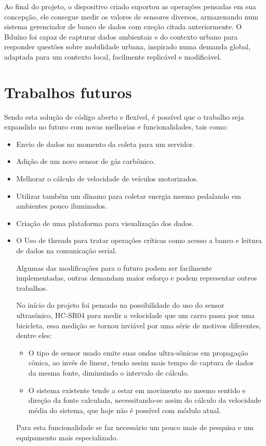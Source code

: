 \documentclass[final,12pt, times, 5p, twocolumn]{elsarticle}
\begin{document}
Ao final do projeto, o dispositivo criado suportou as operações pensadas em sua concepção, ele consegue medir os valores de sensores diversos, armazenando num sistema gerenciador de banco de dados com exeção citada anteriormente. O Bduíno foi capaz de capturar dados ambientais e do contexto urbano para responder questões sobre mobilidade urbana, inspirado numa demanda global, adaptada para um contexto local, facilmente replicável e modificável.

\section{Trabalhos futuros}

Sendo esta solução de código aberto e flexível, é possível que o trabalho seja expandido no futuro com novas melhorias e funcionalidades, tais como:

\begin{itemize}

  \item Envio de dados no momento da coleta para um servidor.
  \item Adição de um novo sensor de gás carbônico.
  \item Melhorar o cálculo de velocidade de veículos motorizados.
  \item Utilizar também um dînamo para coletar energia mesmo pedalando em ambientes pouco iluminados.
  \item Criação de uma plataforma para visualização dos dados.
  \item O Uso de threads para tratar operações críticas como acesso a banco e leitura de dados na comunicação serial.
  
Algumas das modificações para o futuro podem ser facilmente implementadas, outras demandam maior esforço e podem representar outros trabalhos.

No início do projeto foi pensado na possibilidade do uso do sensor ultrasônico, HC-SR04 para medir a velocidade que um carro passa por uma bicicleta, essa medição se tornou inviável por uma série de motivos diferentes, dentre eles: 

\begin{itemize}
\item O tipo de sensor usado emite suas ondas ultra-sônicas em propagação cônica, ao invés de linear, tendo assim mais tempo de captura de dados da mesma fonte, diminuindo o intervalo de cálculo.

\item O sistema existente tende a estar em movimento no mesmo sentido e direção da fonte calculada, necessitando-se assim do cálculo da velocidade média do sistema, que hoje não é possível com módulo atual.
\end{itemize}

Para esta funcionalidade se faz necessário um pouco mais de pesquisa e um equipamento mais especializado.


\end{itemize}
\end{document}
